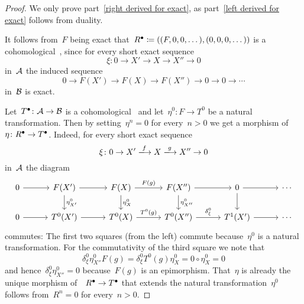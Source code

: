 \begin{proof}
  We only prove part~\ref*{right derived for exact}, as part~\ref*{left derived for exact} follows from duality.
  
  It follows from~$F$ being exact that~$R^\bullet \coloneqq ((F,0,0,\dotsc), (0,0,0,\dotsc))$ is a cohomological~{\deltafun}, since for every short exact sequence
  \[
    \xi
    \colon
    0
    \to
    X'
    \to
    X
    \to
    X''
    \to
    0
  \]
  in~$\mathcal{A}$ the induced sequence
  \[
    0
    \to
    F(X')
    \to
    F(X)
    \to
    F(X'')
    \to
    0
    \to
    0
    \to
    \dotsb
  \]
  in~$\mathcal{B}$ is exact.
  
  Let~$T^\bullet \colon \mathcal{A} \to \mathcal{B}$ is a cohomological~{\deltafun} and let~$\eta^0 \colon F \to T^0$ be a natural transformation.
  Then by setting~$\eta^n = 0$ for every~$n > 0$ we get a morphism of~{\deltafun}~$\eta \colon R^\bullet \to T^\bullet$.
  Indeed, for every short exact sequence
  \[
    \xi
    \colon
    0
    \to
    X'
    \xlongto{f}
    X
    \xlongto{g}
    X''
    \to
    0
  \]
  in~$\mathcal{A}$ the diagram
  \[
    \begin{tikzcd}[column sep = 3em]
        0
        \arrow{r}
      & F(X')
        \arrow{r}
        \arrow{d}[right]{\eta^0_{X'}}
      & F(X)
        \arrow{r}[above]{F(g)}
        \arrow{d}[right]{\eta^0_{X}}
      & F(X'')
        \arrow{r}
        \arrow{d}[right]{\eta^0_{X''}}
      & 0
        \arrow{r}
        \arrow{d}
      & \dotsb
      \\
        0
        \arrow{r}
      & T^0(X')
        \arrow{r}
      & T^0(X)
        \arrow{r}[above]{T^0(g)}
      & T^0(X'')
        \arrow{r}[above]{\delta^0_\xi}
      & T^1(X')
        \arrow{r}
      & \dotsb
    \end{tikzcd}
  \]
  commutes:
  The first two squares (from the left) commute because~$\eta^0$ is a natural transformation.
  For the commutativity of the third square we note that
  \[
      \delta^0_\xi \eta^0_{X''} F(g)
    = \delta^0_\xi T^0(g) \eta^0_X
    = 0 \circ \eta^0_X
    = 0
  \]
  and hence~$\delta^0_\xi \eta^0_{X''} = 0$ because~$F(g)$ is an epimorphism.
  That~$\eta$ is already the unique morphism of~{\deltafun}~$R^\bullet \to T^\bullet$ that extends the natural transformation~$\eta^0$ follows from~$R^n = 0$ for every~$n > 0$.
\end{proof}




